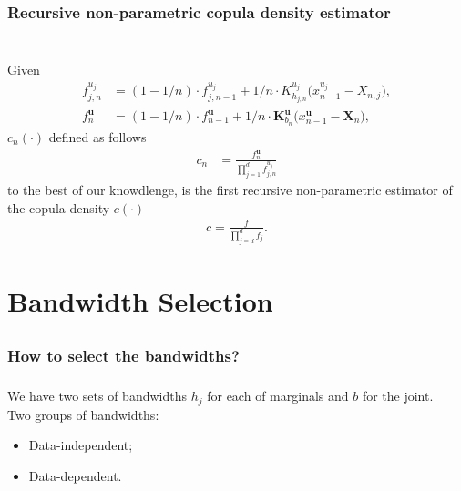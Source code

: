 \documentclass[aspectratio=169]{beamer}
\begin{document}
		\subsubsection{Recursive non-parametric copula density estimator}
			\begin{frame}
				\frametitle{\insertsubsubsection}
				~\\
				Given
				\begin{align}
					f^{u_j}_{j, n} &= (1- 1/n) \cdot f^{u_j}_{j, n-1} + 1/n \cdot K^{u_j}_{h_{j, n}}\big(x^{u_j}_{n-1} - X_{n, j}\big), \\
					f^{\mathbf{u}}_n &= (1- 1/n) \cdot f^{\mathbf{u}}_{n-1} + 1/n \cdot \mathbf{K}_{b_n}^{\mathbf{u}} \big(x_{n-1}^{\mathbf{u}} - \mathbf{X}_n\big),
				\end{align}
				$ c_n(\cdot) $ defined as follows
				\begin{align}
					c_n &= \frac{f^{\mathbf{u}}_n}{\prod_{j=1}^{d}f^{u_j}_{j, n}}
				\end{align}
				to the best of our knowdlenge, is the first recursive non-parametric estimator of the copula density $ c(\cdot) $\\[-4ex]
				\begin{align}
					c = \frac{f}{\prod_{j=d}^{d}f_j}.
				\end{align}
				
			\end{frame}
			
		
\section{Bandwidth Selection}
	\subsection{}
		\subsubsection{How to select the bandwidths?}
			\begin{frame}
				\frametitle{\insertsubsubsection}
				
				We have two sets of bandwidths $ h_j $ for each of marginals and $ b $ for the joint. \\[1em]
				
				\onslide<2-> Two groups of bandwidths:
				\begin{itemize}
					\item Data-independent;
					\item Data-dependent.
				\end{itemize}
				
			\end{frame}
			
\end{document}
